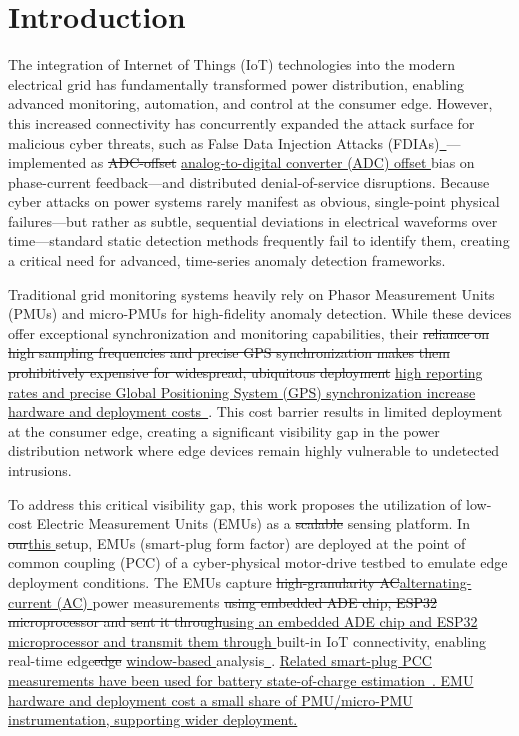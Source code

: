 \documentclass[conference,onecolumn,letterpaper]{IEEEtran} %
\providecommand{\DIFadd}[1]{{\protect\color{blue} \sf #1}} %
\providecommand{\DIFdel}[1]{{\protect\color{red} \scriptsize #1}} %
\providecommand{\DIFaddbegin}{} %
\providecommand{\DIFaddend}{} %
\providecommand{\DIFdelbegin}{} %
\providecommand{\DIFdelend}{} %
\renewcommand{\DIFadd}[1]{{\protect\color{blue}\protect\uline{#1}}}
\renewcommand{\DIFdel}[1]{{\protect\color{red}\protect\sout{#1}}}
\begin{document}
\section{Introduction}
The integration of Internet of Things (IoT) technologies into the modern electrical grid has fundamentally transformed power distribution, enabling advanced monitoring, automation, and control at the consumer edge. However, this increased connectivity has concurrently expanded the attack surface for malicious cyber threats, such as False Data Injection Attacks (FDIAs)\DIFaddbegin \DIFadd{~\mbox{\cite{liu2009}}}\DIFaddend ---implemented as \DIFdelbegin \DIFdel{ADC-offset }\DIFdelend \DIFaddbegin \DIFadd{analog-to-digital converter (ADC) offset }\DIFaddend bias on phase-current feedback---and distributed denial-of-service disruptions. Because cyber attacks on power systems rarely manifest as obvious, single-point physical failures---but rather as subtle, sequential deviations in electrical waveforms over time---standard static detection methods frequently fail to identify them, creating a critical need for advanced, time-series anomaly detection frameworks.

Traditional grid monitoring systems heavily rely on Phasor Measurement Units (PMUs) and micro-PMUs for high-fidelity anomaly detection. While these devices offer exceptional synchronization and monitoring capabilities, their \DIFdelbegin \DIFdel{reliance on high sampling frequencies and precise GPS synchronization makes them prohibitively expensive for widespread, ubiquitous deployment }\DIFdelend \DIFaddbegin \DIFadd{high reporting rates and precise Global Positioning System (GPS) synchronization increase hardware and deployment costs~\mbox{\cite{vonmeier2017}}}\DIFaddend . This cost barrier results in limited deployment at the consumer edge, creating a significant visibility gap in the power distribution network where edge devices remain highly vulnerable to undetected intrusions.

To address this critical visibility gap, this work proposes the utilization of low-cost Electric Measurement Units (EMUs) as a \DIFdelbegin \DIFdel{scalable }\DIFdelend sensing platform. In \DIFdelbegin \DIFdel{our}\DIFdelend \DIFaddbegin \DIFadd{this }\DIFaddend setup, EMUs (smart-plug form factor) are deployed at the point of common coupling (PCC) of a cyber-physical motor-drive testbed to emulate edge deployment conditions. The EMUs capture \DIFdelbegin \DIFdel{high-granularity AC}\DIFdelend \DIFaddbegin \DIFadd{alternating-current (AC) }\DIFaddend power measurements \DIFdelbegin \DIFdel{using embedded ADE chip, ESP32 microprocessor and sent it through}\DIFdelend \DIFaddbegin \DIFadd{using an embedded ADE chip and ESP32 microprocessor and transmit them through }\DIFaddend built-in IoT connectivity, enabling real-time edge\DIFdelbegin \DIFdel{edge }\DIFdelend \DIFaddbegin \DIFadd{window-based }\DIFaddend analysis\DIFaddbegin \DIFadd{~\mbox{\cite{najarEMU2026}}}\DIFaddend . \DIFaddbegin \DIFadd{Related smart-plug PCC measurements have been used for battery state-of-charge estimation~\mbox{\cite{najarSOC2026}}. EMU hardware and deployment cost a small share of PMU/micro-PMU instrumentation, supporting wider deployment.}\DIFaddend  
\end{document}

